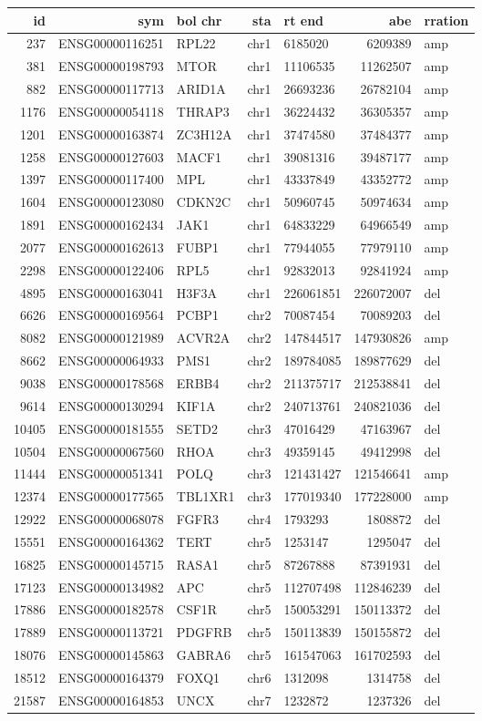\documentclass[]{article}
\begin{document}
\begin{longtable}[]{@{}rrlrlrl@{}}
\toprule
id & sym & bol chr & sta & rt end & abe & rration\tabularnewline
\midrule
\endhead
237 & ENSG00000116251 & RPL22 & chr1 & 6185020 & 6209389 &
amp\tabularnewline
381 & ENSG00000198793 & MTOR & chr1 & 11106535 & 11262507 &
amp\tabularnewline
882 & ENSG00000117713 & ARID1A & chr1 & 26693236 & 26782104 &
amp\tabularnewline
1176 & ENSG00000054118 & THRAP3 & chr1 & 36224432 & 36305357 &
amp\tabularnewline
1201 & ENSG00000163874 & ZC3H12A & chr1 & 37474580 & 37484377 &
amp\tabularnewline
1258 & ENSG00000127603 & MACF1 & chr1 & 39081316 & 39487177 &
amp\tabularnewline
1397 & ENSG00000117400 & MPL & chr1 & 43337849 & 43352772 &
amp\tabularnewline
1604 & ENSG00000123080 & CDKN2C & chr1 & 50960745 & 50974634 &
amp\tabularnewline
1891 & ENSG00000162434 & JAK1 & chr1 & 64833229 & 64966549 &
amp\tabularnewline
2077 & ENSG00000162613 & FUBP1 & chr1 & 77944055 & 77979110 &
amp\tabularnewline
2298 & ENSG00000122406 & RPL5 & chr1 & 92832013 & 92841924 &
amp\tabularnewline
4895 & ENSG00000163041 & H3F3A & chr1 & 226061851 & 226072007 &
del\tabularnewline
6626 & ENSG00000169564 & PCBP1 & chr2 & 70087454 & 70089203 &
del\tabularnewline
8082 & ENSG00000121989 & ACVR2A & chr2 & 147844517 & 147930826 &
amp\tabularnewline
8662 & ENSG00000064933 & PMS1 & chr2 & 189784085 & 189877629 &
del\tabularnewline
9038 & ENSG00000178568 & ERBB4 & chr2 & 211375717 & 212538841 &
del\tabularnewline
9614 & ENSG00000130294 & KIF1A & chr2 & 240713761 & 240821036 &
del\tabularnewline
10405 & ENSG00000181555 & SETD2 & chr3 & 47016429 & 47163967 &
del\tabularnewline
10504 & ENSG00000067560 & RHOA & chr3 & 49359145 & 49412998 &
del\tabularnewline
11444 & ENSG00000051341 & POLQ & chr3 & 121431427 & 121546641 &
amp\tabularnewline
12374 & ENSG00000177565 & TBL1XR1 & chr3 & 177019340 & 177228000 &
amp\tabularnewline
12922 & ENSG00000068078 & FGFR3 & chr4 & 1793293 & 1808872 &
del\tabularnewline
15551 & ENSG00000164362 & TERT & chr5 & 1253147 & 1295047 &
del\tabularnewline
16825 & ENSG00000145715 & RASA1 & chr5 & 87267888 & 87391931 &
del\tabularnewline
17123 & ENSG00000134982 & APC & chr5 & 112707498 & 112846239 &
del\tabularnewline
17886 & ENSG00000182578 & CSF1R & chr5 & 150053291 & 150113372 &
del\tabularnewline
17889 & ENSG00000113721 & PDGFRB & chr5 & 150113839 & 150155872 &
del\tabularnewline
18076 & ENSG00000145863 & GABRA6 & chr5 & 161547063 & 161702593 &
del\tabularnewline
18512 & ENSG00000164379 & FOXQ1 & chr6 & 1312098 & 1314758 &
del\tabularnewline
21587 & ENSG00000164853 & UNCX & chr7 & 1232872 & 1237326 &
del\tabularnewline

\end{longtable}
\end{document}
